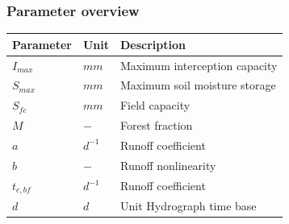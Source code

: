 \subsubsection{Parameter overview}
\begin{table}[htbp]
  \centering
    \begin{tabular}{lll}
    \toprule
    Parameter & Unit  & Description \\
    \midrule
    $I_{max}$ & $mm$  & Maximum interception capacity \\
    $S_{max}$ & $mm$  & Maximum soil moisture storage \\
    $S_{fc}$ & $mm$  & Field capacity \\
    $M$   & $-$   & Forest fraction \\
    $a$   & $d^{-1}$ & Runoff coefficient \\
    $b$   & $-$   & Runoff nonlinearity \\
    $t_{c,bf}$ & $d^{-1}$ & Runoff coefficient \\
    $d$   & $d$   & Unit Hydrograph time base \\
    \bottomrule
    \end{tabular}%
  \label{tab:addlabel}%
\end{table}%

